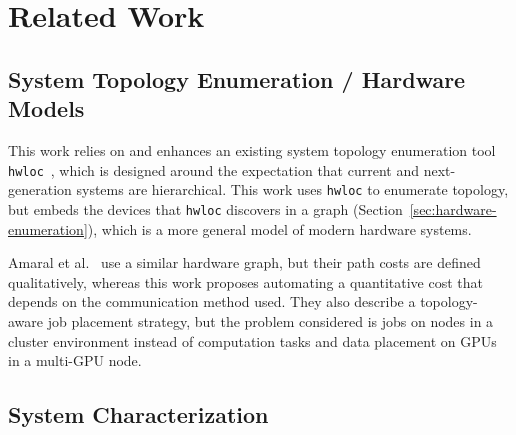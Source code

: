 \chapter{Related Work}
\label{ch:related}

\section{System Topology Enumeration / Hardware Models}

This work relies on and enhances an existing system topology enumeration tool \texttt{hwloc}~\cite{broquedis2010hwloc}, which is designed around the expectation that current and next-generation systems are hierarchical.
This work uses \texttt{hwloc} to enumerate topology, but embeds the devices that \texttt{hwloc} discovers in a graph (Section~\ref{sec:hardware-enumeration}), which is a more general model of modern hardware systems.

Amaral et al.~\cite{amaral2017topology} use a similar hardware graph, but their path costs are defined qualitatively, whereas this work proposes automating a quantitative cost that depends on the communication method used.
They also describe a topology-aware job placement strategy, but the problem considered is jobs on nodes in a cluster environment instead of computation tasks and data placement on GPUs in a multi-GPU node.

\section{System Characterization}


